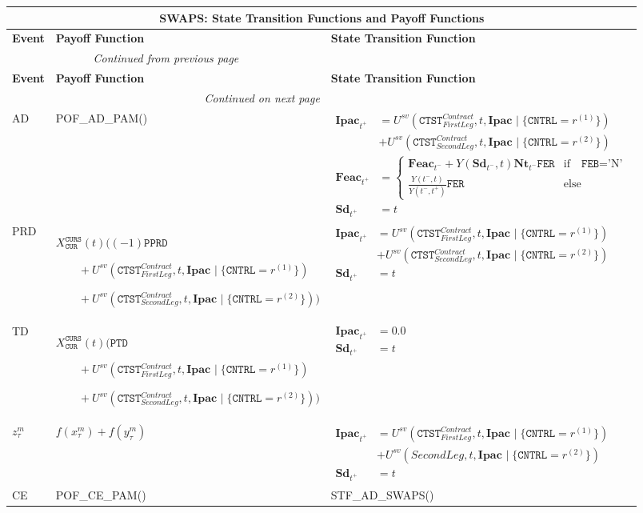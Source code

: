 \documentclass[9pt,oneside]{amsart}
\newenvironment{functions}[1]{
	\hfill %
    	\begin{longtable}{| p{0.05\textwidth} | p{0.42\textwidth} |  p{0.48\textwidth} |}
	\multicolumn{3}{c}{\textbf{#1: State Transition Functions and Payoff Functions}}\\
	\hline
	\textbf{Event} & \textbf{Payoff Function} & \textbf{State Transition Function}\\
	\hline
	\endfirsthead
	\multicolumn{2}{c}{\textit{Continued from previous page}} \\
	\hline
	\textbf{Event} & \textbf{Payoff Function} & \textbf{State Transition Function}\\
	\hline
	\endhead
	\hline \multicolumn{2}{r}{\textit{Continued on next page}} \\
	\endfoot
	\endlastfoot
}{%
	\hline
    	\end{longtable}
}
\newcommand{\svar}[2]{\textbf{#1}_{#2}}
\newcommand{\attr}[1]{\texttt{#1}}
\newcommand{\stf}[2]{STF\_#1\_#2()}
\newcommand{\pof}[2]{POF\_#1\_#2()}
\newcommand{\yfr}[2]{Y(#1,#2)}
\newcommand{\cldsv}[4]{U^{sv}(#1,#2,\svar{#3}{} \mid\{#4\})}
\newcommand{\fev}[1]{f(#1)}
\begin{document}
\begin{functions}{SWAPS}
	AD & \pof{AD}{PAM} & {$\begin{aligned}
				\svar{Ipac}{t^+} &= \cldsv{\attr{CTST}_{FirstLeg}^{Contract}}{t}{Ipac}{\attr{CNTRL}=r^{(1)}} \\
						&+ \cldsv{\attr{CTST}_{SecondLeg}^{Contract}}{t}{Ipac}{\attr{CNTRL}=r^{(2)}} \\
				\svar{Feac}{t^+} &= \begin{cases} \svar{Feac}{t^-} + \yfr{\svar{Sd}{t^-}}{t}\svar{Nt}{t^-}\attr{FER} & \text{if} \quad \attr{FEB}=\text{'N'} \\
					\frac{\yfr{t^-}{t}}{\yfr{t^-}{t^+}}\attr{FER} & \text{else} \end{cases} \\
				\svar{Sd}{t^+} &= t \end{aligned}$} \\
	\hline
	PRD & $X_{\attr{CUR}}^{\attr{CURS}}(t) ( (-1)\attr{PPRD}$ \par
				 $\qquad + \cldsv{\attr{CTST}_{FirstLeg}^{Contract}}{t}{Ipac}{\attr{CNTRL}=r^{(1)}}$ \par
				 $\qquad + \cldsv{\attr{CTST}_{SecondLeg}^{Contract}}{t}{Ipac}{\attr{CNTRL}=r^{(2)}})$
		& {$\begin{aligned}
				\svar{Ipac}{t^+} &= \cldsv{\attr{CTST}_{FirstLeg}^{Contract}}{t}{Ipac}{\attr{CNTRL}=r^{(1)}} \\
						&+ \cldsv{\attr{CTST}_{SecondLeg}^{Contract}}{t}{Ipac}{\attr{CNTRL}=r^{(2)}} \\
				\svar{Sd}{t^+} &= t \end{aligned}$} \\
	\hline
	TD & $X_{\attr{CUR}}^{\attr{CURS}}(t) (\attr{PTD}$ \par
				 $\qquad + \cldsv{\attr{CTST}_{FirstLeg}^{Contract}}{t}{Ipac}{\attr{CNTRL}=r^{(1)}}$ \par
				 $\qquad + \cldsv{\attr{CTST}_{SecondLeg}^{Contract}}{t}{Ipac}{\attr{CNTRL}=r^{(2)}})$
		& {$\begin{aligned}
				\svar{Ipac}{t^+} &= 0.0 \\
				\svar{Sd}{t^+} &= t \end{aligned}$} \\
	\hline
	$z_\tau^m$ & $\fev{x_\tau^m}+\fev{y_\tau^m}$
		& {$\begin{aligned}
				\svar{Ipac}{t^+} &= \cldsv{\attr{CTST}_{FirstLeg}^{Contract}}{t}{Ipac}{\attr{CNTRL}=r^{(1)}} \\						&+ \cldsv{SecondLeg}{t}{Ipac}{\attr{CNTRL}=r^{(2)}} \\
				\svar{Sd}{t^+} &= t \end{aligned}$} \\
	\hline
	CE & \pof{CE}{PAM} & \stf{AD}{SWAPS} \\
\end{functions}
\end{document}

